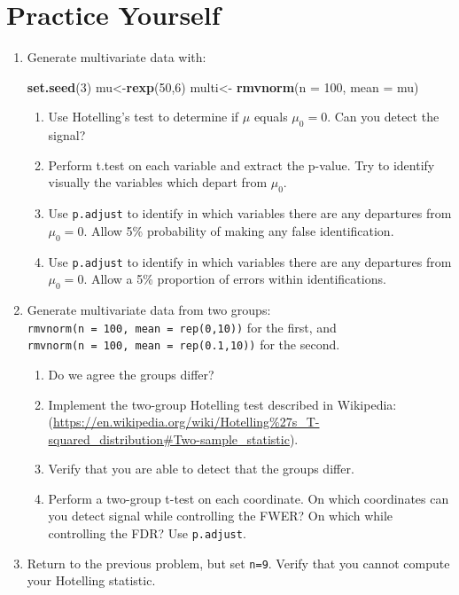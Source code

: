 \documentclass[]{book}
\newenvironment{Shaded}{\begin{snugshade}}{\end{snugshade}}
\newcommand{\DataTypeTok}[1]{\textcolor[rgb]{0.13,0.29,0.53}{#1}}
\newcommand{\DecValTok}[1]{\textcolor[rgb]{0.00,0.00,0.81}{#1}}
\newcommand{\KeywordTok}[1]{\textcolor[rgb]{0.13,0.29,0.53}{\textbf{#1}}}
\newcommand{\NormalTok}[1]{#1}
\newcommand{\StringTok}[1]{\textcolor[rgb]{0.31,0.60,0.02}{#1}}
\providecommand{\tightlist}{%
  \setlength{\itemsep}{0pt}\setlength{\parskip}{0pt}}
\theoremstyle{definition}
\theoremstyle{definition}
\theoremstyle{definition}
\theoremstyle{remark}
\begin{document}
\hypertarget{practice-yourself-5}{%
\section{Practice Yourself}\label{practice-yourself-5}}

\begin{enumerate}
\def\labelenumi{\arabic{enumi}.}
\item
  Generate multivariate data with:

\begin{Shaded}
\begin{Highlighting}[]
\KeywordTok{set.seed}\NormalTok{(}\DecValTok{3}\NormalTok{)}
\NormalTok{mu<-}\KeywordTok{rexp}\NormalTok{(}\DecValTok{50}\NormalTok{,}\DecValTok{6}\NormalTok{)}
\NormalTok{multi<-}\StringTok{  }\KeywordTok{rmvnorm}\NormalTok{(}\DataTypeTok{n =} \DecValTok{100}\NormalTok{, }\DataTypeTok{mean =}\NormalTok{ mu) }
\end{Highlighting}
\end{Shaded}

  \begin{enumerate}
  \def\labelenumii{\alph{enumii}.}
  \tightlist
  \item
    Use Hotelling's test to determine if \(\mu\) equals \(\mu_0=0\). Can you detect the signal?
  \item
    Perform t.test on each variable and extract the p-value. Try to identify visually the variables which depart from \(\mu_0\).
  \item
    Use \texttt{p.adjust} to identify in which variables there are any departures from \(\mu_0=0\). Allow 5\% probability of making any false identification.
  \item
    Use \texttt{p.adjust} to identify in which variables there are any departures from \(\mu_0=0\). Allow a 5\% proportion of errors within identifications.
  \end{enumerate}
\item
  Generate multivariate data from two groups: \texttt{rmvnorm(n\ =\ 100,\ mean\ =\ rep(0,10))} for the first, and \texttt{rmvnorm(n\ =\ 100,\ mean\ =\ rep(0.1,10))} for the second.

  \begin{enumerate}
  \def\labelenumii{\alph{enumii}.}
  \tightlist
  \item
    Do we agree the groups differ?
  \item
    Implement the two-group Hotelling test described in Wikipedia: (\url{https://en.wikipedia.org/wiki/Hotelling\%27s_T-squared_distribution\#Two-sample_statistic}).
  \item
    Verify that you are able to detect that the groups differ.
  \item
    Perform a two-group t-test on each coordinate. On which coordinates can you detect signal while controlling the FWER? On which while controlling the FDR? Use \texttt{p.adjust}.
  \end{enumerate}
\item
  Return to the previous problem, but set \texttt{n=9}. Verify that you cannot compute your Hotelling statistic.
\end{enumerate}
\end{document}
